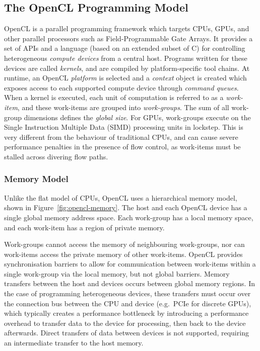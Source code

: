 \subsection{The OpenCL Programming Model}

OpenCL is a parallel programming framework which targets CPUs, GPUs, and other parallel processors such as Field-Programmable Gate Arrays. It provides a set of APIs and a language (based on an extended subset of C) for controlling heterogeneous \emph{compute devices} from a central host. Programs written for these devices are called \emph{kernels}, and are compiled by platform-specific tool chains. At runtime, an OpenCL \emph{platform} is selected and a \emph{context} object is created which exposes access to each supported compute device through \emph{command queues}. When a kernel is executed, each unit of computation is referred to as a \emph{work-item}, and these work-items are grouped into \emph{work-groups}. The sum of all work-group dimensions defines the \emph{global size}. For GPUs, work-groups execute on the Single Instruction Multiple Data (SIMD) processing units in lockstep. This is very different from the behaviour of traditional CPUs, and can cause severe performance penalties in the presence of flow control, as work-items must be stalled across divering flow paths.


\subsubsection{Memory Model}

Unlike the flat model of CPUs, OpenCL uses a hierarchical memory model, shown in Figure~\ref{fig:opencl-memory}. The host and each OpenCL device has a single global memory address space. Each work-group has a local memory space, and each work-item has a region of private memory.

Work-groups cannot access the memory of neighbouring work-groups, nor can work-items access the private memory of other work-items. OpenCL provides synchronisation barriers to allow for communication between work-items within a single work-group via the local memory, but not global barriers. Memory transfers between the host and devices occurs between global memory regions. In the case of programming heterogeneous devices, these transfers must occur over the connection bus between the CPU and device (e.g.\ PCIe for discrete GPUs), which typically creates a performance bottleneck by introducing a performance overhead to transfer data to the device for processing, then back to the device afterwards. Direct transfers of data between devices is not supported, requiring an intermediate transfer to the host memory.

